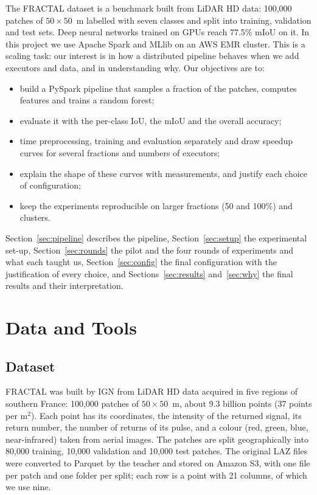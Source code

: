 \documentclass[a4paper, 11pt]{article} %
\begin{document}
The FRACTAL dataset \cite{gaydon2024fractal} is a benchmark built from LiDAR HD data: 100,000 patches of $50 \times 50$~m labelled with seven classes and split into training, validation and test sets. Deep neural networks trained on GPUs reach 77.5\% mIoU on it. In this project we use Apache Spark and MLlib on an AWS EMR cluster. This is a scaling task: our interest is in how a distributed pipeline behaves when we add executors and data, and in understanding why. Our objectives are to:
\begin{itemize}
\item build a PySpark pipeline that samples a fraction of the patches, computes features and trains a random forest;
\item evaluate it with the per-class IoU, the mIoU and the overall accuracy;
\item time preprocessing, training and evaluation separately and draw speedup curves for several fractions and numbers of executors;
\item explain the shape of these curves with measurements, and justify each choice of configuration;
\item keep the experiments reproducible on larger fractions (50 and 100\%) and clusters.
\end{itemize}
Section~\ref{sec:pipeline} describes the pipeline, Section~\ref{sec:setup} the experimental set-up, Section~\ref{sec:rounds} the pilot and the four rounds of experiments and what each taught us, Section~\ref{sec:config} the final configuration with the justification of every choice, and Sections~\ref{sec:results} and~\ref{sec:why} the final results and their interpretation.

\section{Data and Tools}

\subsection{Dataset}
FRACTAL was built by IGN from LiDAR HD data acquired in five regions of southern France: 100,000 patches of $50 \times 50$~m, about 9.3 billion points (37 points per m$^2$). Each point has its coordinates, the intensity of the returned signal, its return number, the number of returns of its pulse, and a colour (red, green, blue, near-infrared) taken from aerial images. The patches are split geographically into 80,000 training, 10,000 validation and 10,000 test patches. The original LAZ files were converted to Parquet by the teacher and stored on Amazon S3, with one file per patch and one folder per split; each row is a point with 21 columns, of which we use nine.
\end{document}
